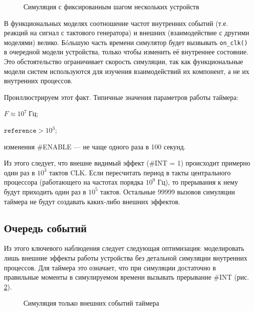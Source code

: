 \begin{figure}[htp]
    \centering
    \caption[Симуляция с фиксированным шагом]{Симуляция с фиксированным шагом нескольких устройств}
    \label{fig:time-stepped-sim}
\end{figure}

В функциональных моделях соотношение частот внутренних событий (т.е. реакций на сигнал с тактового генератора) и внешних (взаимодействие с другими моделями) велико. Бóльшую часть времени симулятор будет вызвывать \texttt{on_clk()} в очередной модели устройства, только чтобы изменить её внутреннее состояние. Это обстоятельство ограничивает скорость симуляции, так как функциональные модели систем используются для изучения взаимодействий их компонент, а не их внутренних процессов.

Проиллюстрируем этот факт. Типичные значения параметров работы таймера:

\begin{itemize*}
    \item $F \approx 10^7\ \text{Гц}$;
    \item $\mathtt{reference} > 10^3$;
    \item изменения \#ENABLE — не чаще одного раза в 100 секунд.
\end{itemize*}

Из этого следует, что внешне видимый эффект (\#INT = 1) происходит примерно один раз в $10^3$ тактов CLK. Если пересчитать период в такты центрального процессора (работающего на частотах порядка $10^9$ Гц), то прерывания к нему будут приходить один раз в $10^5$ тактов. Остальные 99999 вызовов симуляции таймера не будут создавать каких-либо внешних эффектов.

\subsection{Очередь событий}

Из этого ключевого наблюдения следует следующая оптимизация: моделировать лишь внешние эффекты работы устройства без детальной симуляции внутренних процессов. Для таймера это означает, что при симуляции достаточно в правильные моменты в симулируемом времени вызывать прерывание \#INT (рис. \ref{fig:timer-events}).

\begin{figure}[htp]
    \centering
    \caption[Симуляция только внешних событий таймера]{Симуляция только внешних событий таймера}
    \label{fig:timer-events}
\end{figure}

